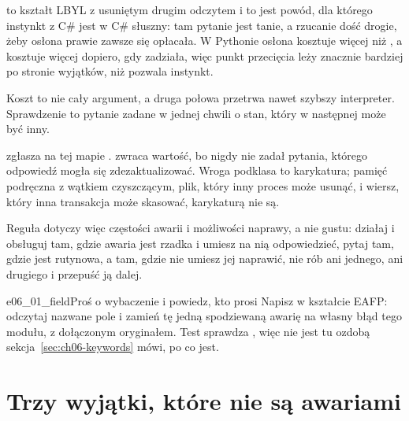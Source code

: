 \begin{csbox}
 to kształt LBYL z usuniętym drugim odczytem i to jest
powód, dla którego instynkt z C\# jest w C\# słuszny: tam pytanie jest tanie,
a rzucanie dość drogie, żeby osłona prawie zawsze się opłacała. W Pythonie
osłona kosztuje więcej niż , a  kosztuje więcej dopiero,
gdy zadziała, więc punkt przecięcia leży znacznie bardziej po stronie
wyjątków, niż pozwala instynkt.
\end{csbox}

\noindent
Koszt to nie cały argument, a druga połowa przetrwa nawet szybszy interpreter.
Sprawdzenie to pytanie zadane w jednej chwili o stan, który w następnej może
być inny.


\noindent
{} zgłasza na tej mapie . 
zwraca wartość, bo nigdy nie zadał pytania, którego odpowiedź mogła się
zdezaktualizować. Wroga podklasa  to karykatura; pamięć podręczna z
wątkiem czyszczącym, plik, który inny proces może usunąć, i wiersz, który inna
transakcja może skasować, karykaturą nie są.

Reguła dotyczy więc częstości awarii i możliwości naprawy, a nie gustu:
działaj i obsługuj tam, gdzie awaria jest rzadka i umiesz na nią odpowiedzieć,
pytaj tam, gdzie jest rutynowa, a tam, gdzie nie umiesz jej naprawić, nie rób
ani jednego, ani drugiego i przepuść ją dalej.


\begin{exercise}{e06_01_field}{Proś o wybaczenie i powiedz, kto prosi}
Napisz  w kształcie EAFP: odczytaj nazwane pole i zamień tę
jedną spodziewaną awarię na własny błąd tego modułu, z dołączonym
oryginałem. Test sprawdza , więc  nie
jest tu ozdobą \dash{} sekcja~\ref{sec:ch06-keywords} mówi, po co jest.
\end{exercise}

\section{Trzy wyjątki, które nie są awariami}
\label{sec:ch06-protocol}

